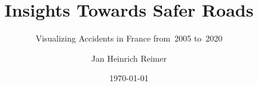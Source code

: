 \documentclass[usegeometry=true]{scrartcl}
\begin{document}
\subject{Project Report for the Module \\  \\ in Summer Semester~2022}
\title{Insights Towards Safer Roads}
\subtitle{Visualizing Accidents in France from~2005 to~2020}
\author{Jan Heinrich Reimer}
\date{\today}
\maketitle

\tableofcontents









\printbibliography
\end{document}
